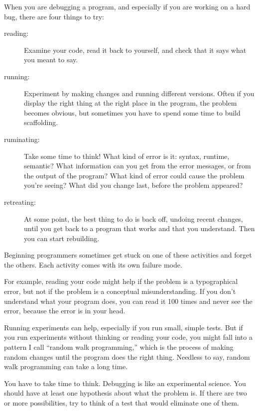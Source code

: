 \documentclass[10pt]{book}
\begin{document}
When you are debugging a program, and especially if you are
working on a hard bug, there are four things to try:

\begin{description}

\item[reading:] Examine your code, read it back to yourself, and
check that it says what you meant to say.

\item[running:] Experiment by making changes and running different
versions.  Often if you display the right thing at the right place
in the program, the problem becomes obvious, but sometimes you have to
spend some time to build scaffolding.

\item[ruminating:] Take some time to think!  What kind of error
is it: syntax, runtime, semantic?  What information can you get from
the error messages, or from the output of the program?  What kind of
error could cause the problem you're seeing?  What did you change
last, before the problem appeared?

\item[retreating:] At some point, the best thing to do is back
off, undoing recent changes, until you get back to a program that
works and that you understand.  Then you can start rebuilding.

\end{description}

Beginning programmers sometimes get stuck on one of these activities
and forget the others.  Each activity comes with its own failure
mode.

For example, reading your code might help if the problem is a
typographical error, but not if the problem is a conceptual
misunderstanding.  If you don't understand what your program does, you
can read it 100 times and never see the error, because the error is in
your head.

Running experiments can help, especially if you run small, simple
tests.  But if you run experiments without thinking or reading your
code, you might fall into a pattern I call ``random walk programming,''
which is the process of making random changes until the program
does the right thing.  Needless to say, random walk programming
can take a long time.

You have to take time to think.  Debugging is like an
experimental science.  You should have at least one hypothesis about
what the problem is.  If there are two or more possibilities, try to
think of a test that would eliminate one of them.
\end{document}

